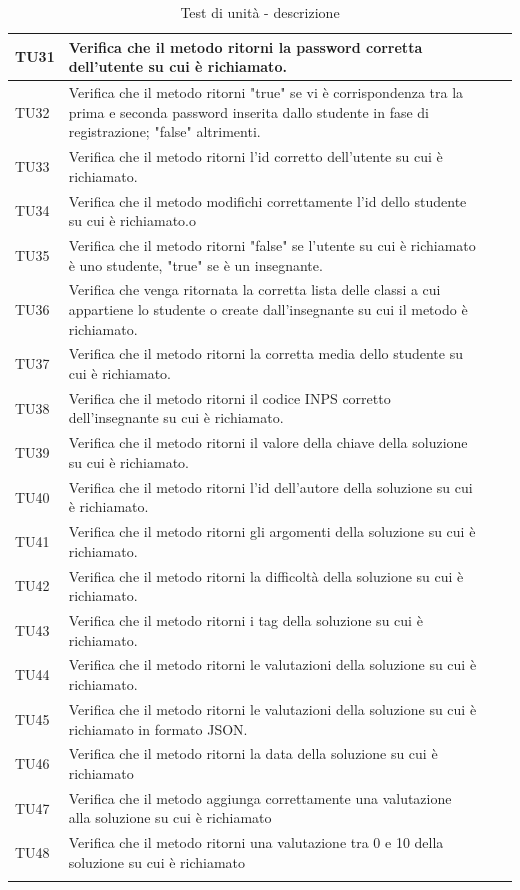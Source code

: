 \begin{longtable}{|>{\centering\arraybackslash}m{1.6cm}|>{\centering\arraybackslash}m{6.41cm}|>{\centering\arraybackslash}m{3.1cm}| c |}
		TU31 & Verifica che il metodo ritorni la password corretta dell'utente su cui è richiamato. \\ \hline
		TU32 & Verifica che il metodo ritorni "true" se vi è corrispondenza tra la prima e seconda password inserita dallo studente in fase di registrazione; "false" altrimenti.  \\ \hline
		TU33 & Verifica che il metodo ritorni l'id corretto dell'utente su cui è richiamato.\\ \hline
		TU34 & Verifica che il metodo modifichi correttamente l'id dello studente su cui è richiamato.o  \\ \hline
		TU35 & Verifica che il metodo ritorni "false" se l'utente su cui è richiamato è uno studente, "true" se è un insegnante. \\ \hline
		TU36 & Verifica che venga ritornata la corretta lista delle classi a cui appartiene lo studente o create dall'insegnante su cui il metodo è richiamato.  \\ \hline
		TU37 & Verifica che il metodo ritorni la corretta media dello studente su cui è richiamato. \\ \hline
		TU38 & Verifica che il metodo ritorni il codice INPS corretto dell'insegnante su cui è richiamato. \\ \hline
		TU39 & Verifica che il metodo ritorni il valore della chiave della soluzione su cui è richiamato.  \\ \hline
		TU40 & Verifica che il metodo ritorni l'id dell'autore della soluzione su cui è richiamato. \\ \hline
		TU41 & Verifica che il metodo ritorni gli argomenti della soluzione su cui è richiamato. \\ \hline
		TU42 & Verifica che il metodo ritorni la difficoltà della soluzione su cui è richiamato. \\ \hline
		TU43 & Verifica che il metodo ritorni i tag della soluzione su cui è richiamato. \\ \hline
		TU44 & Verifica che il metodo ritorni le valutazioni della soluzione su cui è richiamato. \\ \hline
		TU45 & Verifica che il metodo ritorni le valutazioni della soluzione su cui è richiamato in formato JSON.\\ \hline
		TU46 & Verifica che il metodo ritorni la data della soluzione su cui è richiamato \\ \hline
		TU47 & Verifica che il metodo aggiunga correttamente una valutazione alla soluzione su cui è richiamato\\ \hline
		TU48 & Verifica che il metodo ritorni una valutazione tra 0 e 10 della soluzione su cui è richiamato \\ \hline
		\caption{Test di unità - descrizione}
\end{longtable}

